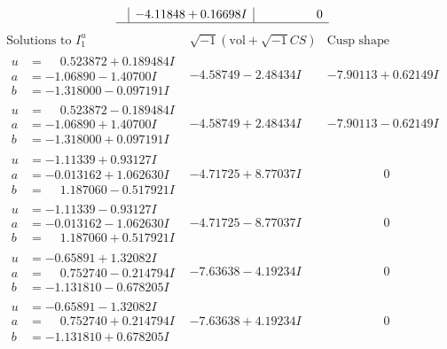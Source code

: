 \documentclass[1p]{elsarticle_modified}
\theoremstyle{definition}
\newcommand{\I}{\sqrt{-1}}
\begin{document}
$$\begin{array}{c|c|c}
 & -4.11848 + 0.16698 I & \phantom{-0.000000 } 0\\
 \hline 
 \end{array}$$\newpage$$\begin{array}{c|c|c}  
\text{Solutions to }I^u_{1}& \I (\text{vol} + \sqrt{-1}CS) & \text{Cusp shape}\\
 \hline 
\begin{aligned}
u &= \phantom{-}0.523872 + 0.189484 I \\
a &= -1.06890 - 1.40700 I \\
b &= -1.318000 - 0.097191 I\end{aligned}
 & -4.58749 - 2.48434 I & -7.90113 + 0.62149 I \\ \hline\begin{aligned}
u &= \phantom{-}0.523872 - 0.189484 I \\
a &= -1.06890 + 1.40700 I \\
b &= -1.318000 + 0.097191 I\end{aligned}
 & -4.58749 + 2.48434 I & -7.90113 - 0.62149 I \\ \hline\begin{aligned}
u &= -1.11339 + 0.93127 I \\
a &= -0.013162 + 1.062630 I \\
b &= \phantom{-}1.187060 - 0.517921 I\end{aligned}
 & -4.71725 + 8.77037 I & \phantom{-0.000000 } 0 \\ \hline\begin{aligned}
u &= -1.11339 - 0.93127 I \\
a &= -0.013162 - 1.062630 I \\
b &= \phantom{-}1.187060 + 0.517921 I\end{aligned}
 & -4.71725 - 8.77037 I & \phantom{-0.000000 } 0 \\ \hline\begin{aligned}
u &= -0.65891 + 1.32082 I \\
a &= \phantom{-}0.752740 - 0.214794 I \\
b &= -1.131810 - 0.678205 I\end{aligned}
 & -7.63638 - 4.19234 I & \phantom{-0.000000 } 0 \\ \hline\begin{aligned}
u &= -0.65891 - 1.32082 I \\
a &= \phantom{-}0.752740 + 0.214794 I \\
b &= -1.131810 + 0.678205 I\end{aligned}
 & -7.63638 + 4.19234 I & \phantom{-0.000000 } 0 \\ \hline\begin{aligned}

\end{aligned}
\end{array}$$
\end{document}
